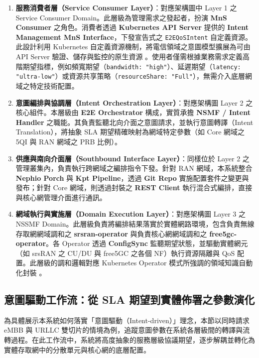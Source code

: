 \begin{enumerate}
    \item \textbf{服務消費者層（Service Consumer Layer）}：對應架構圖中 Layer 1 之 Service Consumer Domain。此層級為管理需求之發起者，扮演 \textbf{MnS Consumer} 之角色。消費者透過 \textbf{Kubernetes API Server} 提供的 \textbf{Intent Management MnS Interface}，下發宣告式之 \texttt{E2EQoSIntent} 自定義資源。此設計利用 Kubernetes 自定義資源機制，將電信領域之意圖模型擴展為可由 API Server 驗證、儲存與監控的原生資源 \cite{kubernetes_custom_resources}。使用者僅需根據業務需求定義高階期望指標，例如頻寬期望（\texttt{bandwidth: "high"}）、延遲期望（\texttt{latency: "ultra-low"}）或資源共享策略（\texttt{resourceShare: "Full"}），無需介入底層網域之特定技術配置。

    \item \textbf{意圖編排與協調層（Intent Orchestration Layer）}：對應架構圖 Layer 2 之核心組件。本層級由 \textbf{E2E Orchestrator} 構成，實質承擔 \textbf{NSMF / Intent Handler} 之職能。其負責監聽北向介面之意圖請求，並執行意圖轉譯（Intent Translation），將抽象 SLA 期望精確映射為網域特定參數（如 Core 網域之 5QI 與 RAN 網域之 PRB 比例）。

    \item \textbf{供應與南向介面層（Southbound Interface Layer）}：同樣位於 Layer 2 之管理叢集內，負責執行跨網域之編排指令下發。針對 RAN 網域，本系統整合 \textbf{Nephio Porch} 與 \textbf{Kpt Pipeline}，透過 \textbf{Git Repo} 實施配置套件之變更與發布；針對 Core 網域，則透過封裝之 \textbf{REST Client} 執行混合式編排，直接與核心網管理介面進行通訊。

    \item \textbf{網域執行與實施層（Domain Execution Layer）}：對應架構圖 Layer 3 之 NSSMF Domain。此層級負責將編排結果落實於實體網路環境，包含負責無線存取網網域調和之 \textbf{srsran-operator} 與負責核心網網域調和之 \textbf{free5gc-operator}。各 Operator 透過 \textbf{ConfigSync} 監聽期望狀態，並驅動實體網元（如 srsRAN 之 CU/DU 與 free5GC 之各個 NF）執行資源隔離與 QoS 配置。此層級的調和邏輯對應 Kubernetes Operator 模式所強調的領域知識自動化封裝 \cite{kubernetes_operator_pattern}。
\end{enumerate}

\subsection{意圖驅動工作流：從 SLA 期望到實體佈署之參數演化}
\label{sec:intent_workflow_trace}

為具體展示本系統如何落實「意圖驅動（Intent-driven）」理念，本節以同時請求 eMBB 與 URLLC 雙切片的情境為例，追蹤意圖參數在系統各層級間的轉譯與流轉過程。在此工作流中，系統將高度抽象的服務層級協議期望，逐步解耦並轉化為實體存取網中的分散單元與核心網的底層配置。

